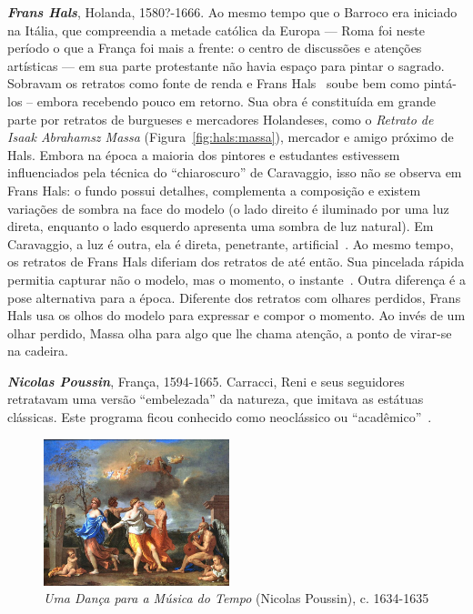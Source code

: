 \textbf{\emph{Frans Hals}}, Holanda, 1580?-1666. Ao mesmo tempo que o
Barroco era iniciado na Itália, que compreendia a metade católica da
Europa --- Roma foi neste período o que a França foi mais a frente: o
centro de discussões e atenções artísticas --- em sua parte
protestante não havia espaço para pintar o sagrado.~\cite{gombrich}
Sobravam os retratos como fonte de renda e Frans Hals~\cite{grimm}
soube bem como pintá-los -- embora recebendo pouco em retorno. Sua
obra é constituída em grande parte por retratos de burgueses e
mercadores Holandeses, como o \textit{Retrato de Isaak Abrahamsz
  Massa} (Figura~\ref{fig:hals:massa}), mercador e amigo próximo de
Hals.  Embora na época a maioria dos pintores e estudantes estivessem
influenciados pela técnica do ``chiaroscuro'' de Caravaggio, isso não
se observa em Frans Hals: o fundo possui detalhes, complementa a
composição e existem variações de sombra na face do modelo (o lado
direito é iluminado por uma luz direta, enquanto o lado esquerdo
apresenta uma sombra de luz natural). Em Caravaggio, a luz é outra,
ela é direta, penetrante, artificial~\cite{gombrich}. Ao mesmo tempo,
os retratos de Frans Hals diferiam dos retratos de até então. Sua
pincelada rápida permitia capturar não o modelo, mas o momento, o
instante~\cite{peter}. Outra diferença é a pose alternativa para a
época. Diferente dos retratos com olhares perdidos, Frans Hals usa os
olhos do modelo para expressar e compor o momento. Ao invés de um
olhar perdido, Massa olha para algo que lhe chama atenção, a ponto de
virar-se na cadeira.

\textbf{\emph{Nicolas Poussin}}, França, 1594-1665. Carracci, Reni e
seus seguidores retratavam uma versão ``embelezada'' da natureza, que
imitava as estátuas clássicas. Este programa ficou conhecido como
neoclássico ou ``acadêmico''~\cite{gombrich}.

\begin{figure}
  \begin{center}
    \includegraphics[width=0.48\textwidth]{figs/poussin_danca.png}
  \end{center}
  \caption{\emph{Uma Dança para a Música do Tempo} (Nicolas Poussin), c. 1634-1635}
  \label{fig:poussin:danca}
\end{figure}

